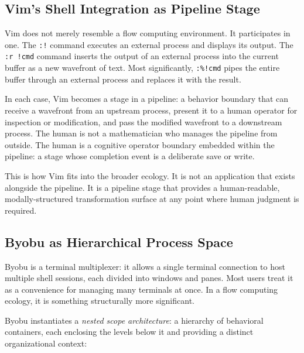 \documentclass[12pt, a4paper]{article}
\begin{document}
\subsection{Vim's Shell Integration as Pipeline Stage}

Vim does not merely resemble a flow computing environment. It
participates in one. The \texttt{:!} command executes an external
process and displays its output. The \texttt{:r~!cmd} command
inserts the output of an external process into the current buffer
as a new wavefront of text. Most significantly, \texttt{:\%!cmd}
pipes the entire buffer through an external process and replaces
it with the result.

In each case, Vim becomes a stage in a pipeline: a behavior
boundary that can receive a wavefront from an upstream process,
present it to a human operator for inspection or modification,
and pass the modified wavefront to a downstream process. The
human is not a mathematician who manages the pipeline from
outside. The human is a cognitive operator boundary embedded
within the pipeline: a stage whose completion event is a
deliberate save or write.

This is how Vim fits into the broader ecology. It is not an
application that exists alongside the pipeline. It is a
pipeline stage that provides a human-readable, modally-structured
transformation surface at any point where human judgment is
required.

\subsection{Byobu as Hierarchical Process Space}

Byobu is a terminal multiplexer: it allows a single terminal
connection to host multiple shell sessions, each divided into
windows and panes. Most users treat it as a convenience for
managing many terminals at once. In a flow computing ecology,
it is something structurally more significant.

Byobu instantiates a \emph{nested scope architecture}: a
hierarchy of behavioral containers, each enclosing the levels
below it and providing a distinct organizational context:

\begin{center}
\end{center}
\end{document}
